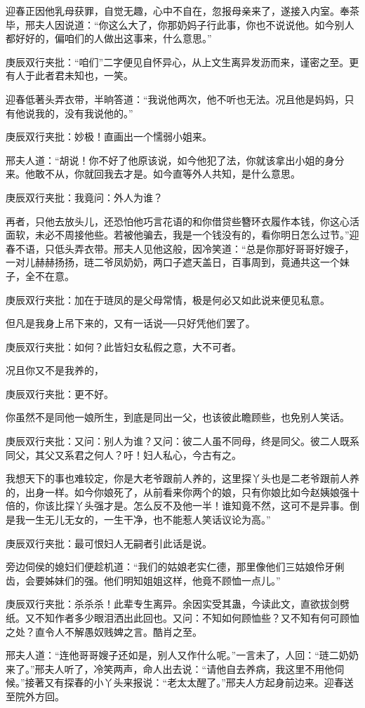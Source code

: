 \begin{parag}


    迎春正因他乳母获罪，自觉无趣，心中不自在，忽报母亲来了，遂接入内室。奉茶毕，邢夫人因说道：“你这么大了，你那奶妈子行此事，你也不说说他。如今别人都好好的，偏咱们的人做出这事来，什么意思。”\begin{note}庚辰双行夹批：“咱们”二字便见自怀异心，从上文生离异发沥而来，谨密之至。更有人于此者君未知也，一笑。\end{note}迎春低著头弄衣带，半晌答道：“我说他两次，他不听也无法。况且他是妈妈，只有他说我的，没有我说他的。”\begin{note}庚辰双行夹批：妙极！直画出一个懦弱小姐来。\end{note}邢夫人道：“胡说！你不好了他原该说，如今他犯了法，你就该拿出小姐的身分来。他敢不从，你就回我去才是。如今直等外人共知，是什么意思。\begin{note}庚辰双行夹批：我竟问：外人为谁？\end{note}再者，只他去放头儿，还恐怕他巧言花语的和你借贷些簪环衣履作本钱，你这心活面软，未必不周接他些。若被他骗去，我是一个钱没有的，看你明日怎么过节。”迎春不语，只低头弄衣带。邢夫人见他这般，因冷笑道：“总是你那好哥哥好嫂子，一对儿赫赫扬扬，琏二爷凤奶奶，两口子遮天盖日，百事周到，竟通共这一个妹子，全不在意。\begin{note}庚辰双行夹批：加在于琏凤的是父母常情，极是何必又如此说来便见私意。\end{note}但凡是我身上吊下来的，又有一话说──只好凭他们罢了。\begin{note}庚辰双行夹批：如何？此皆妇女私假之意，大不可者。\end{note}况且你又不是我养的，\begin{note}庚辰双行夹批：更不好。\end{note}你虽然不是同他一娘所生，到底是同出一父，也该彼此瞻顾些，也免别人笑话。\begin{note}庚辰双行夹批：又问：别人为谁？又问：彼二人虽不同母，终是同父。彼二人既系同父，其父又系君之何人？吁！妇人私心，今古有之。\end{note}我想天下的事也难较定，你是大老爷跟前人养的，这里探丫头也是二老爷跟前人养的，出身一样。如今你娘死了，从前看来你两个的娘，只有你娘比如今赵姨娘强十倍的，你该比探丫头强才是。怎么反不及他一半！谁知竟不然，这可不是异事。倒是我一生无儿无女的，一生干净，也不能惹人笑话议论为高。”\begin{note}庚辰双行夹批：最可恨妇人无嗣者引此话是说。\end{note}旁边伺侯的媳妇们便趁机道：“我们的姑娘老实仁德，那里像他们三姑娘伶牙俐齿，会要姊妹们的强。他们明知姐姐这样，他竟不顾恤一点儿。”\begin{note}庚辰双行夹批：杀杀杀！此辈专生离异。余因实受其蛊，今读此文，直欲拔剑劈纸。又不知作者多少眼泪洒出此回也。又问：不知如何顾恤些？又不知有何可顾恤之处？直令人不解愚奴贱婢之言。酷肖之至。\end{note}邢夫人道：“连他哥哥嫂子还如是，别人又作什么呢。”一言未了，人回：“琏二奶奶来了。”邢夫人听了，冷笑两声，命人出去说：“请他自去养病，我这里不用他伺候。”接著又有探春的小丫头来报说：“老太太醒了。”邢夫人方起身前边来。迎春送至院外方回。
\end{parag}


